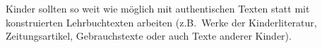 Kinder sollten so weit wie möglich mit authentischen Texten statt mit konstruierten Lehrbuchtexten arbeiten (z.B.\ Werke der Kinderliteratur, Zeitungsartikel, Gebrauchstexte oder auch Texte anderer Kinder).
